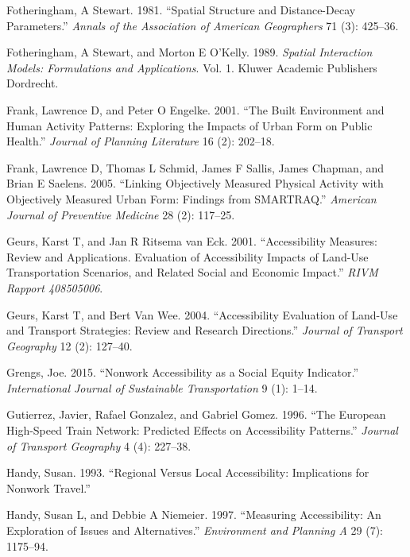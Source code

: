 \documentclass[preprint, 3p,
authoryear]{elsarticle} %
\newlength{\cslhangindent}
\newenvironment{CSLReferences}[2] %
 {\begin{list}{}{%
  \setlength{\itemindent}{0pt}
  \setlength{\leftmargin}{0pt}
  \setlength{\parsep}{0pt}
  \ifodd #1
   \setlength{\leftmargin}{\cslhangindent}
   \setlength{\itemindent}{-1\cslhangindent}
  \fi
  \setlength{\itemsep}{#2\baselineskip}}}
 {\end{list}}
\begin{document}
\begin{CSLReferences}{1}{0}
Fotheringham, A Stewart. 1981. {``Spatial Structure and Distance-Decay
Parameters.''} \emph{Annals of the Association of American Geographers}
71 (3): 425--36.

Fotheringham, A Stewart, and Morton E O'Kelly. 1989. \emph{Spatial
Interaction Models: Formulations and Applications}. Vol. 1. Kluwer
Academic Publishers Dordrecht.

Frank, Lawrence D, and Peter O Engelke. 2001. {``The Built Environment
and Human Activity Patterns: Exploring the Impacts of Urban Form on
Public Health.''} \emph{Journal of Planning Literature} 16 (2): 202--18.

Frank, Lawrence D, Thomas L Schmid, James F Sallis, James Chapman, and
Brian E Saelens. 2005. {``Linking Objectively Measured Physical Activity
with Objectively Measured Urban Form: Findings from SMARTRAQ.''}
\emph{American Journal of Preventive Medicine} 28 (2): 117--25.

Geurs, Karst T, and Jan R Ritsema van Eck. 2001. {``Accessibility
Measures: Review and Applications. Evaluation of Accessibility Impacts
of Land-Use Transportation Scenarios, and Related Social and Economic
Impact.''} \emph{RIVM Rapport 408505006}.

Geurs, Karst T, and Bert Van Wee. 2004. {``Accessibility Evaluation of
Land-Use and Transport Strategies: Review and Research Directions.''}
\emph{Journal of Transport Geography} 12 (2): 127--40.

Grengs, Joe. 2015. {``Nonwork Accessibility as a Social Equity
Indicator.''} \emph{International Journal of Sustainable Transportation}
9 (1): 1--14.

Gutierrez, Javier, Rafael Gonzalez, and Gabriel Gomez. 1996. {``The
European High-Speed Train Network: Predicted Effects on Accessibility
Patterns.''} \emph{Journal of Transport Geography} 4 (4): 227--38.

Handy, Susan. 1993. {``Regional Versus Local Accessibility: Implications
for Nonwork Travel.''}

Handy, Susan L, and Debbie A Niemeier. 1997. {``Measuring Accessibility:
An Exploration of Issues and Alternatives.''} \emph{Environment and
Planning A} 29 (7): 1175--94.


\end{CSLReferences}
\end{document}
